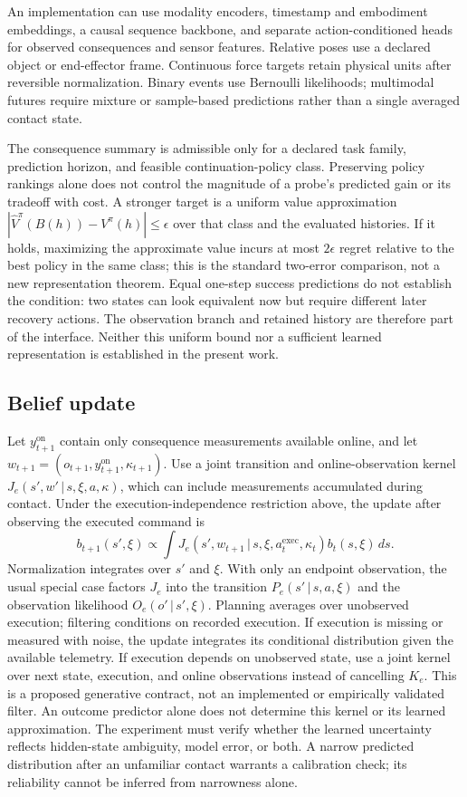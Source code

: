 \documentclass[11pt]{article}
\newcommand{\given}{\,\vert\,}
\begin{document}
An implementation can use modality encoders, timestamp and embodiment embeddings, a causal sequence backbone, and separate action-conditioned heads for observed consequences and sensor features. Relative poses use a declared object or end-effector frame. Continuous force targets retain physical units after reversible normalization. Binary events use Bernoulli likelihoods; multimodal futures require mixture or sample-based predictions rather than a single averaged contact state.

The consequence summary is admissible only for a declared task family, prediction horizon, and feasible continuation-policy class. Preserving policy rankings alone does not control the magnitude of a probe's predicted gain or its tradeoff with cost. A stronger target is a uniform value approximation $|\widehat V^\pi(B(h))-V^\pi(h)|\leq\epsilon$ over that class and the evaluated histories. If it holds, maximizing the approximate value incurs at most $2\epsilon$ regret relative to the best policy in the same class; this is the standard two-error comparison, not a new representation theorem. Equal one-step success predictions do not establish the condition: two states can look equivalent now but require different later recovery actions. The observation branch and retained history are therefore part of the interface. Neither this uniform bound nor a sufficient learned representation is established in the present work.

\subsection{Belief update}
Let $y_{t+1}^{\mathrm{on}}$ contain only consequence measurements available online, and let $w_{t+1}=(o_{t+1},y_{t+1}^{\mathrm{on}},\kappa_{t+1})$. Use a joint transition and online-observation kernel $J_e(s',w'\given s,\xi,a,\kappa)$, which can include measurements accumulated during contact. Under the execution-independence restriction above, the update after observing the executed command is
\begin{equation}
b_{t+1}(s',\xi)\propto
\int J_e(s',w_{t+1}\given s,\xi,a_t^{\mathrm{exec}},\kappa_t)b_t(s,\xi)\,ds.
\end{equation}
Normalization integrates over $s'$ and $\xi$. With only an endpoint observation, the usual special case factors $J_e$ into the transition $P_e(s'\given s,a,\xi)$ and the observation likelihood $O_e(o'\given s',\xi)$. Planning averages over unobserved execution; filtering conditions on recorded execution. If execution is missing or measured with noise, the update integrates its conditional distribution given the available telemetry. If execution depends on unobserved state, use a joint kernel over next state, execution, and online observations instead of cancelling $K_e$. This is a proposed generative contract, not an implemented or empirically validated filter. An outcome predictor alone does not determine this kernel or its learned approximation. The experiment must verify whether the learned uncertainty reflects hidden-state ambiguity, model error, or both. A narrow predicted distribution after an unfamiliar contact warrants a calibration check; its reliability cannot be inferred from narrowness alone.
\end{document}
